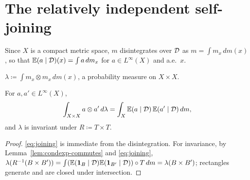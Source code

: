 \section{The relatively independent self-joining}

Since $X$ is a compact metric space, $m$ disintegrates over $\mathcal{D}$ as $m = \int m_x \, dm(x)$,
so that $\mathbb{E}(a \mid \mathcal{D})(x) = \int a \, dm_x$ for $a \in L^\infty(X)$ and a.e.\ $x$.

\begin{definition}
  \label{def:joining}
  \leanok
  $\lambda \coloneqq \int m_x \otimes m_x \, dm(x)$, a probability measure on $X \times X$.
\end{definition}

\begin{lemma}
  \label{lem:joining}
  \leanok
  For $a, a' \in L^\infty(X)$,
  \begin{equation}
    \label{eq:joining}
    \int_{X \times X} a \otimes a' \, d\lambda = \int_X \mathbb{E}(a \mid \mathcal{D})\, \mathbb{E}(a' \mid \mathcal{D}) \, dm ,
  \end{equation}
  and $\lambda$ is invariant under $R \coloneqq T \times T$.
\end{lemma}

\begin{proof}
  \eqref{eq:joining} is immediate from the disintegration.  For invariance, by
  Lemma~\ref{lem:condexp-commutes} and \eqref{eq:joining},
  $\lambda(R^{-1}(B \times B')) = \int (\mathbb{E}(\mathbf{1}_B \mid \mathcal{D})\mathbb{E}(\mathbf{1}_{B'} \mid \mathcal{D})) \circ T \, dm
   = \lambda(B \times B')$; rectangles generate and are closed under intersection.
\end{proof}

